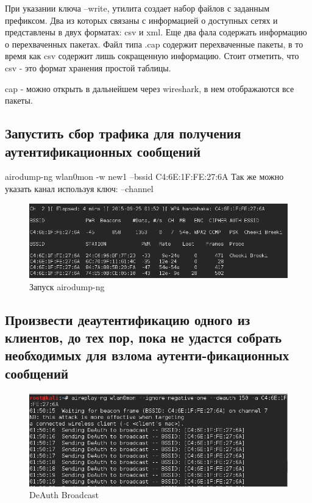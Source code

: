 \documentclass[11pt, a4paper]{article}		%
\begin{document}
При указании ключа --write, утилита создает набор файлов с заданным префиксом. Два из которых связаны с информацией о доступных сетях и представлены в двух форматах: csv и xml. Еще два фала содержать информацию о перехваченных пакетах. Файл типа .cap содержит перехваченные пакеты, в то время как csv содержит лишь сокращенную информацию. Стоит отметить, что csv - это формат хранения простой таблицы.

cap - можно открыть в дальнейшем через wireshark, в нем отображаются все пакеты.





\subsection{Запустить сбор трафика для получения аутентификационных сообщений}

airodump-ng wlan0mon -w new1 --bssid C4:6E:1F:FE:27:6A 
Так же можно указать канал используя ключ: --channel

\begin{figure}[h!]
	\centering
	\includegraphics[scale=0.60]{res/3}
	\caption{Запуск airodump-ng}
\end{figure}



\subsection{Произвести деаутентификацию одного из клиентов, до тех пор, пока не удастся собрать необходимых для взлома аутенти-фикационных сообщений}

\begin{figure}[h!]
	\centering
	\includegraphics[scale=0.60]{res/4}
	\caption{DeAuth Broadcast}
\end{figure}
\end{document}
